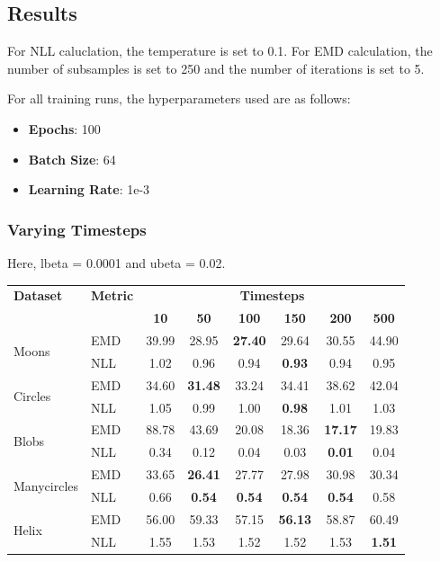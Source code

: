 \documentclass[11pt]{article}
\begin{document}
\subsection{Results}

For NLL caluclation, the temperature is set to 0.1.
For EMD calculation, the number of subsamples is set to 250 and the number of iterations is set to 5.

For all training runs, the hyperparameters used are as follows:
\begin{itemize}
    \item \textbf{Epochs}: 100
    \item \textbf{Batch Size}: 64
    \item \textbf{Learning Rate}: 1e-3
\end{itemize}

\subsubsection{Varying Timesteps}
Here, lbeta = 0.0001 and ubeta = 0.02.

\begin{longtable}{|l|l|c|c|c|c|c|c|}
    \hline
    \textbf{Dataset} & \textbf{Metric} & \multicolumn{6}{c|}{\textbf{Timesteps}} \\
    \cline{3-8}
    & & \textbf{10} & \textbf{50} & \textbf{100} & \textbf{150} & \textbf{200} & \textbf{500} \\
    \hline
    \multirow{2}{*}{Moons} & EMD & 39.99 & 28.95 & \textbf{27.40} & 29.64 & 30.55 & 44.90 \\
    \cline{2-8}
    & NLL & 1.02 & 0.96 & 0.94 & \textbf{0.93} & 0.94 & 0.95 \\
    \hline
    \multirow{2}{*}{Circles} & EMD & 34.60 & \textbf{31.48} & 33.24 & 34.41 & 38.62 & 42.04 \\
    \cline{2-8}
    & NLL & 1.05 & 0.99 & 1.00 & \textbf{0.98} & 1.01 & 1.03 \\
    \hline
    \multirow{2}{*}{Blobs} & EMD & 88.78 & 43.69 & 20.08 & 18.36 & \textbf{17.17} & 19.83 \\
    \cline{2-8}
    & NLL & 0.34 & 0.12 & 0.04 & 0.03 & \textbf{0.01} & 0.04 \\
    \hline
    \multirow{2}{*}{Manycircles} & EMD & 33.65 & \textbf{26.41} & 27.77 & 27.98 & 30.98 & 30.34 \\
    \cline{2-8}
    & NLL & 0.66 & \textbf{0.54} & \textbf{0.54} & \textbf{0.54} & \textbf{0.54} & 0.58 \\
    \hline
    \multirow{2}{*}{Helix} & EMD & 56.00 & 59.33 & 57.15 & \textbf{56.13} & 58.87 & 60.49 \\
    \cline{2-8}
    & NLL & 1.55 & 1.53 & 1.52 & 1.52 & 1.53 & \textbf{1.51} \\
    \hline
\end{longtable}
\end{document}
